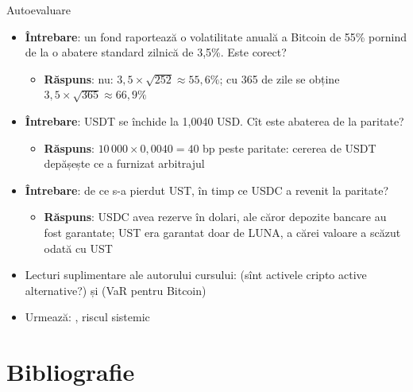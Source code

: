 \begin{frame}{Autoevaluare}
\itemsize{\small}
\begin{itemize}
    \item \textbf{Întrebare}: un fond raportează o volatilitate anuală a Bitcoin de 55\% pornind de la o abatere standard zilnică de 3,5\%. Este corect?
    \begin{itemize}
        \item \textbf{Răspuns}: nu: $3{,}5 \times \sqrt{252} \approx 55{,}6\%$; cu 365 de zile se obține $3{,}5 \times \sqrt{365} \approx 66{,}9\%$
    \end{itemize}
    \item \textbf{Întrebare}: USDT se închide la 1,0040 USD. Cît este abaterea de la paritate?
    \begin{itemize}
        \item \textbf{Răspuns}: $10\,000 \times 0{,}0040 = 40$ bp peste paritate: cererea de USDT depășește ce a furnizat arbitrajul
    \end{itemize}
    \item \textbf{Întrebare}: de ce s-a pierdut UST, în timp ce USDC a revenit la paritate?
    \begin{itemize}
        \item \textbf{Răspuns}: USDC avea rezerve în dolari, ale căror depozite bancare au fost garantate; UST era garantat doar de LUNA, a cărei valoare a scăzut odată cu UST
    \end{itemize}
    \item Lecturi suplimentare ale autorului cursului:  (sînt activele cripto active alternative?) și  (VaR pentru Bitcoin)
    \item Urmează: , riscul sistemic
\end{itemize}
\end{frame}


\section{Bibliografie}

